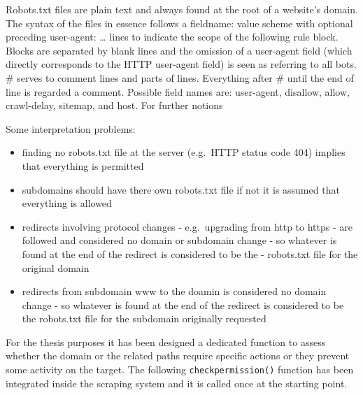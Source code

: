 \documentclass[
  12pt,
  a4paper,
  oneside]{book}
\providecommand{\tightlist}{%
  \setlength{\itemsep}{0pt}\setlength{\parskip}{0pt}}
\begin{document}
Robots.txt files are plain text and always found at the root of a website's domain. The syntax of the files in essence follows a fieldname: value scheme with optional preceding user-agent: \ldots{} lines to indicate the scope of the following rule block. Blocks are separated by blank lines and the omission of a user-agent field (which directly corresponds to the HTTP user-agent field) is seen as referring to all bots. \# serves to comment lines and parts of lines. Everything after \# until the end of line is regarded a comment. Possible field names are: user-agent, disallow, allow, crawl-delay, sitemap, and host. For further notions \citep[\citet{google:robottxt}]{robotstxt}

Some interpretation problems:

\begin{itemize}
\tightlist
\item
  finding no robots.txt file at the server (e.g.~HTTP status code 404) implies that everything is permitted
\item
  subdomains should have there own robots.txt file if not it is assumed that everything is allowed
\item
  redirects involving protocol changes - e.g.~upgrading from http to https - are followed and considered no domain or subdomain change - so whatever is found at the end of the redirect is considered to be the - robots.txt file for the original domain
\item
  redirects from subdomain www to the doamin is considered no domain change - so whatever is found at the end of the redirect is considered to be the robots.txt file for the subdomain originally requested
\end{itemize}

For the thesis purposes it has been designed a dedicated function to assess whether the domain or the related paths require specific actions or they prevent some activity on the target. The following \texttt{checkpermission()} function has been integrated inside the scraping system and it is called once at the starting point.
\end{document}

